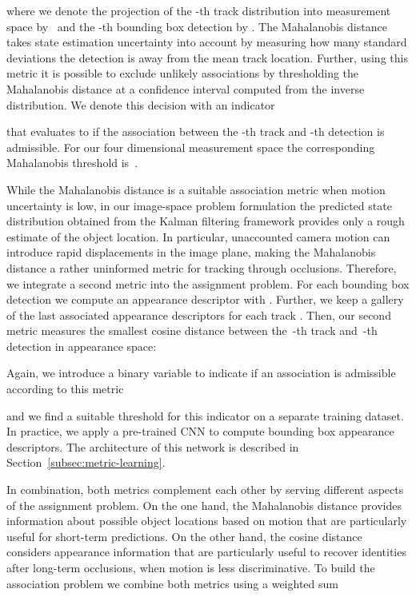 \documentclass{article}
\newcommand{\sectionname}{Section}
\begin{document}
where we denote the projection of the -th track distribution into
measurement space by~ and the -th bounding box
detection by .
The Mahalanobis distance takes state estimation uncertainty into account by
measuring how many standard deviations the detection is away from the mean
track location.
Further, using this metric it is possible to exclude unlikely associations by
thresholding the Mahalanobis distance at a  confidence interval computed
from the inverse  distribution.
We denote this decision with an indicator

that evaluates to  if the association between the -th track and -th
detection is admissible. For our four dimensional measurement space the
corresponding Mahalanobis threshold is~.

While the Mahalanobis distance is a suitable association metric when motion
uncertainty is low, in our image-space problem formulation the predicted
state distribution obtained from the Kalman filtering framework provides only
a rough estimate of the object location.
In particular, unaccounted camera motion can introduce rapid displacements in
the image plane, making the Mahalanobis distance a rather uninformed metric for
tracking through occlusions.
Therefore, we integrate a second metric into the assignment problem.
For each bounding box detection  we compute an
appearance descriptor  with .
Further, we keep a gallery~
of the last  associated appearance descriptors for each track .
Then, our second metric measures the smallest cosine distance between
the~-th track and~-th detection in appearance space:

Again, we introduce a binary variable to indicate if an association is admissible
according to this metric

and we find a suitable threshold for this indicator on a separate training
dataset.
In practice, we apply a pre-trained CNN to compute bounding box appearance
descriptors. The architecture of this network
is described in \sectionname~\ref{subsec:metric-learning}.

In combination, both metrics complement each other by serving different aspects
of the assignment problem. On the one hand, the Mahalanobis distance provides
information about possible object locations based on motion that
are particularly useful for short-term predictions.
On the other hand, the cosine distance considers appearance information that
are particularly useful to recover identities after long-term occlusions, when
motion is less discriminative.
To build the association problem we combine both metrics using a weighted sum
\end{document}
